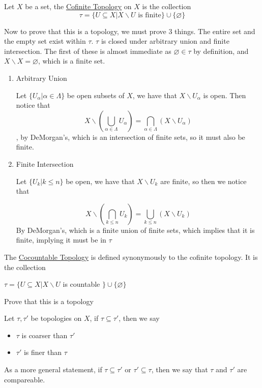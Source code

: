 \begin{definition}
    Let $X$ be a set, the \href{https://en.wikipedia.org/wiki/Cofiniteness#Cofinite_topology}{Cofinite Topology} on $X$ is the collection
    \[\tau=\{U\subseteq X\vert X\backslash U\text{ is finite}\}\cup\{\varnothing\}\]    
\end{definition}
Now to prove that this is a topology, we must prove 3 things. The entire set and the empty set exist within $\tau$. $\tau$ is closed under arbitrary union and finite intersection. The first of these is almost immediate as $\varnothing\in\tau$ by definition, and $X\backslash X=\varnothing$, which is a finite set.
\begin{enumerate}
    \item Arbitrary Union
    
    Let $\{U_\alpha\vert\alpha\in\Lambda\}$ be open subsets of $X$, we have that $X\backslash U_\alpha$ is open. Then notice that \[X\backslash\left(\bigcup_{\alpha\in\Lambda}U_\alpha\right) = \bigcap_{\alpha\in\Lambda}\left(X\backslash U_\alpha\right)\], by DeMorgan's, which is an intersection of finite sets, so it must also be finite.
    \item Finite Intersection
    
    Let $\{U_k\vert k\leq n\}$ be open, we have that $X\backslash U_k$ are finite, so then we notice that
    
    \[X\backslash\left(\bigcap_{k\leq n}U_k\right) = \bigcup_{k\leq n}\left(X\backslash U_k\right)\]
    By DeMorgan's, which is a finite union of finite sets, which implies that it is finite, implying it must be in $\tau$
\end{enumerate}
\begin{definition}
    The \href{https://en.wikipedia.org/wiki/Cocountable_topology}{Cocountable Topology} is defined synonymously to the cofinite topology. It is the collection 
    \begin{center}
        $\tau=\{U\subseteq X\vert X\backslash U$ is countable $\}\cup\{\varnothing\}$
    \end{center}
\end{definition}
Prove that this is a topology
\begin{definition}
    Let $\tau,\tau'$ be topologies on $X$, if $\tau\subseteq\tau'$, then we say 
    \begin{itemize}
        \item $\tau$ is coarser than $\tau'$
        \item $\tau'$ is finer than $\tau$
    \end{itemize}
    As a more general statement, if $\tau\subseteq\tau'$ or $\tau'\subseteq\tau$, then we say that $\tau$ and $\tau'$ are compareable.
\end{definition}
